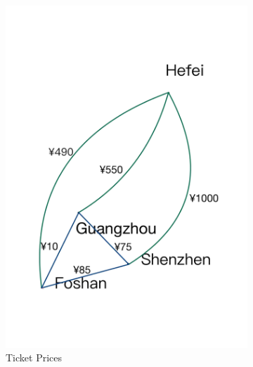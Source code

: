 \documentclass{extarticle}
\begin{document}
\begin{figure}[!ht]
  \centering
  \begin{subfigure}{0.3\textwidth}
      \includegraphics[width=\textwidth]{pic/1.png}
      \caption{Ticket Prices}%
\label{fig:your_image1}
  \end{subfigure}
  \hfill %
  \begin{subfigure}{0.3\textwidth}

\end{subfigure}
\end{figure}
\end{document}
